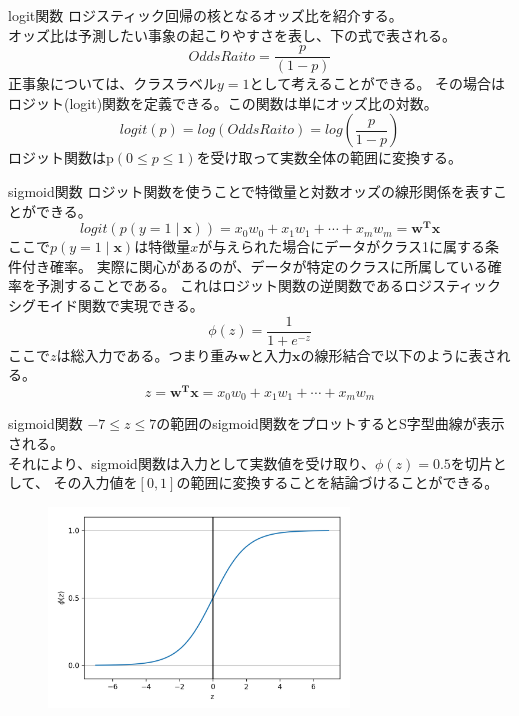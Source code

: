 \documentclass[aspectratio=169, dvipdfmx, 11pt]{beamer} %
\begin{document}
\begin{frame}{logit関数}
    ロジスティック回帰の核となるオッズ比を紹介する。\\
    オッズ比は予測したい事象の起こりやすさを表し、下の式で表される。
    \begin{equation*}
        Odds Raito = \frac{p}{(1-p)}
    \end{equation*}
    正事象については、クラスラベル\(y=1\)として考えることができる。
    その場合はロジット(logit)関数を定義できる。この関数は単にオッズ比の対数。
    \begin{equation*}
        logit(p) = log(OddsRaito) = log(\frac{p}{1-p})
    \end{equation*}
    ロジット関数はp\((0\leq p \leq 1)\)を受け取って実数全体の範囲に変換する。
\end{frame} 

\begin{frame}{sigmoid関数}
    ロジット関数を使うことで特徴量と対数オッズの線形関係を表すことができる。
    \begin{equation*}
        logit(p(y=1 \mid \bm{x})) = x_0w_0 + x_1w_1 + \cdots  + x_mw_m = \bm{w^T}\bm{x}
    \end{equation*}
    ここで\(p(y=1 \mid \bm{x})\)は特徴量\(x\)が与えられた場合にデータがクラス1に属する条件付き確率。
    実際に関心があるのが、データが特定のクラスに所属している確率を予測することである。
    これはロジット関数の逆関数であるロジスティックシグモイド関数で実現できる。
    \begin{equation*}
        \phi(z) = \frac{1}{1+e^{-z}}
    \end{equation*}
    ここで\(z\)は総入力である。つまり重み\(\bm{w}\)と入力\(\bm{x}\)の線形結合で以下のように表される。
    \begin{equation*}
        z = \bm{w^T}\bm{x} = x_0w_0 + x_1w_1 + \cdots  + x_mw_m
    \end{equation*}
\end{frame}

\begin{frame}{sigmoid関数}
    \(-7 \leq z \leq  7\)の範囲のsigmoid関数をプロットするとS字型曲線が表示される。 \\
    それにより、sigmoid関数は入力として実数値を受け取り、\(\phi(z)=0.5\)を切片として、
    その入力値を\([0, 1]\)の範囲に変換することを結論づけることができる。
    \begin{figure}[b]
        \begin{center}
        \includegraphics[width=80mm]{img/day02/fig02.png}
        \end{center}
    \end{figure}
\end{frame}
\end{document}
